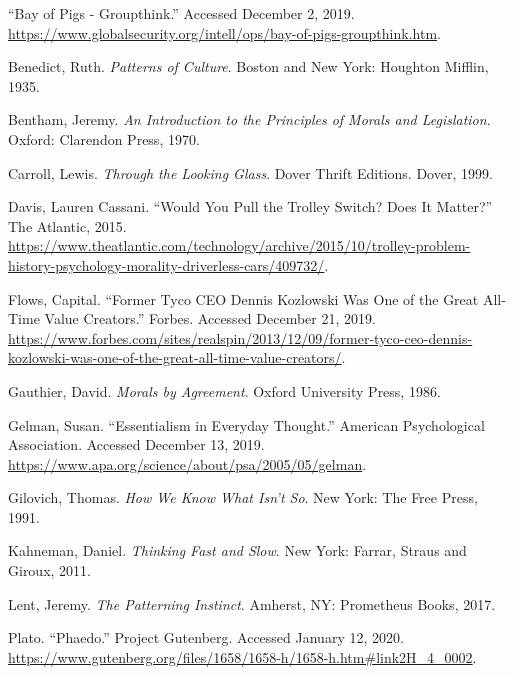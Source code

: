 \documentclass[12pt, openany]{book}
\begin{document}
\hypertarget{refs}{}
\leavevmode\hypertarget{ref-BayPigsGroupthink}{}%
``Bay of Pigs - Groupthink.'' Accessed December 2, 2019. \url{https://www.globalsecurity.org/intell/ops/bay-of-pigs-groupthink.htm}.

\leavevmode\hypertarget{ref-benedictPatternsCulture1935}{}%
Benedict, Ruth. \emph{Patterns of Culture}. Boston and New York: Houghton Mifflin, 1935.

\leavevmode\hypertarget{ref-benthamIntroductionPrinciplesMorals1970}{}%
Bentham, Jeremy. \emph{An Introduction to the Principles of Morals and Legislation}. Oxford: Clarendon Press, 1970.

\leavevmode\hypertarget{ref-carrollLookingGlass1999}{}%
Carroll, Lewis. \emph{Through the Looking Glass}. Dover Thrift Editions. Dover, 1999.

\leavevmode\hypertarget{ref-davisWouldYouPull2015}{}%
Davis, Lauren Cassani. ``Would You Pull the Trolley Switch? Does It Matter?'' The Atlantic, 2015. \url{https://www.theatlantic.com/technology/archive/2015/10/trolley-problem-history-psychology-morality-driverless-cars/409732/}.

\leavevmode\hypertarget{ref-flowsFormerTycoCEO}{}%
Flows, Capital. ``Former Tyco CEO Dennis Kozlowski Was One of the Great All-Time Value Creators.'' Forbes. Accessed December 21, 2019. \url{https://www.forbes.com/sites/realspin/2013/12/09/former-tyco-ceo-dennis-kozlowski-was-one-of-the-great-all-time-value-creators/}.

\leavevmode\hypertarget{ref-gauthierMoralsAgreement1986}{}%
Gauthier, David. \emph{Morals by Agreement}. Oxford University Press, 1986.

\leavevmode\hypertarget{ref-gelmanEssentialismEverydayThought}{}%
Gelman, Susan. ``Essentialism in Everyday Thought.'' American Psychological Association. Accessed December 13, 2019. \url{https://www.apa.org/science/about/psa/2005/05/gelman}.

\leavevmode\hypertarget{ref-gilovichHowWeKnow1991}{}%
Gilovich, Thomas. \emph{How We Know What Isn't So}. New York: The Free Press, 1991.

\leavevmode\hypertarget{ref-kahnemanThinkingFastSlow2011}{}%
Kahneman, Daniel. \emph{Thinking Fast and Slow}. New York: Farrar, Straus and Giroux, 2011.

\leavevmode\hypertarget{ref-lentPatterningInstinct2017}{}%
Lent, Jeremy. \emph{The Patterning Instinct}. Amherst, NY: Prometheus Books, 2017.

\leavevmode\hypertarget{ref-platoPhaedo}{}%
Plato. ``Phaedo.'' Project Gutenberg. Accessed January 12, 2020. \url{https://www.gutenberg.org/files/1658/1658-h/1658-h.htm\#link2H_4_0002}.
\end{document}
